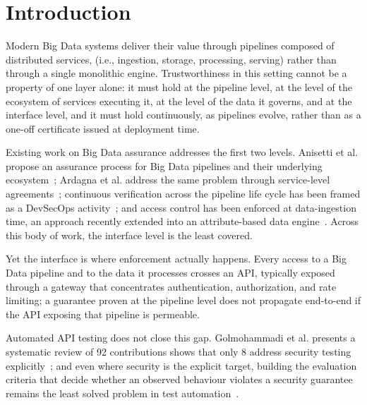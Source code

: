 \section{Introduction}
\label{sec:intro}

Modern Big Data systems deliver their value through pipelines composed of distributed services, (i.e., ingestion, storage, processing, serving) rather than through a single monolithic engine.
Trustworthiness in this setting cannot be a property of one layer alone: it must hold at the pipeline level, at the level of the ecosystem of services executing it, at the level of the data it governs, and at the interface level, and it must hold continuously, as pipelines evolve, rather than as a one-off certificate issued at deployment time.

Existing work on Big Data assurance addresses the first two levels. Anisetti et al. propose an assurance process for Big Data pipelines and their underlying ecosystem~\cite{anisettiAssuranceProcessBig2023}; Ardagna et al. address the same problem through service-level agreements~\cite{ardagnaBigDataAssurance2023}; continuous verification across the pipeline life cycle has been framed as a DevSecOps activity~\cite{anisettiDevSecOpsbasedAssuranceProcess2022}; and access control has been enforced at data-ingestion time, an approach recently extended into an attribute-based data engine~\cite{anisettiDynamicScalableEnforcement2021,polimenoBalancingProtectionQuality2025}.
Across this body of work, the interface level is the least covered.

Yet the interface is where enforcement actually happens. Every access to a Big Data pipeline and to the data it processes crosses an API, typically exposed through a gateway that concentrates authentication, authorization, and rate limiting; a guarantee proven at the pipeline level does not propagate end-to-end if the API exposing that pipeline is permeable.

Automated API testing does not close this gap. Golmohammadi et al. presents a systematic review of 92 contributions shows that only 8 address security testing explicitly~\cite{golmohammadiTestingRESTfulAPIs2023}; and even where security is the explicit target, building the evaluation criteria that decide whether an observed behaviour violates a security guarantee remains the least solved problem in test automation~\cite{barrOracleProblemSoftware2015}.

